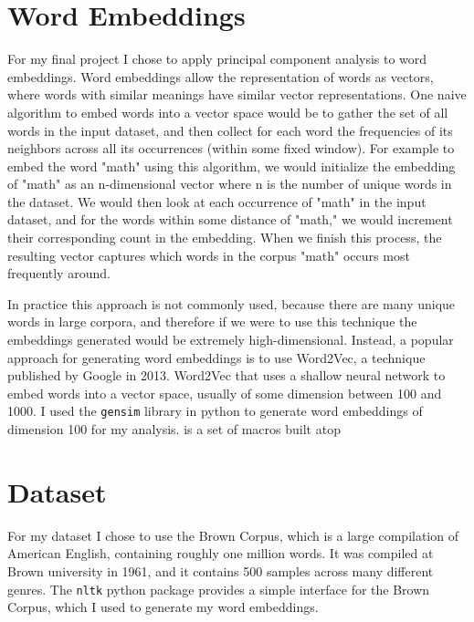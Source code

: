 \documentclass[12pt,letterpaper]{article}
\begin{document}
\section{Word Embeddings}
For my final project I chose to apply principal component analysis to word embeddings.
Word embeddings allow the representation of words as vectors, where words with similar meanings have similar vector representations. One naive algorithm to embed words into a vector space would be to gather the set of all words in the input dataset, and then collect for each word the frequencies of its neighbors across all its occurrences (within some fixed window). For example to embed the word "math" using this algorithm, we would initialize the embedding of "math" as an n-dimensional vector where n is the number of unique words in the dataset. We would then look at each occurrence of "math" in the input dataset, and for the words within some distance of "math," we would increment their corresponding count in the embedding. When we finish this process, the resulting vector captures which words in the corpus "math" occurs most frequently around.

In practice this approach is not commonly used, because there are many unique words in large corpora, and therefore if we were to use this technique the embeddings generated would be extremely high-dimensional. Instead, a popular approach for generating word embeddings is to use Word2Vec, a technique published by Google in 2013. Word2Vec that uses a shallow neural network to embed words into a vector space, usually of some dimension between 100 and 1000. I used the \texttt{gensim} library in python to generate word embeddings of dimension 100 for my analysis.
\cite{lamport94} is a set of macros built atop
\section{Dataset}
For my dataset I chose to use the Brown Corpus, which is a large compilation of American English, containing roughly one million words. It was compiled at Brown university in 1961, and it contains 500 samples across many different genres. The \texttt{nltk} python package provides a simple interface for the Brown Corpus, which I used to generate my word embeddings.
\end{document}
